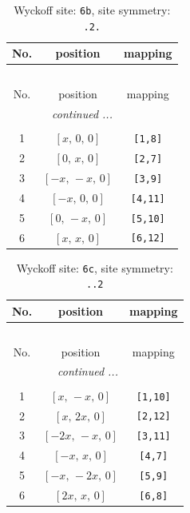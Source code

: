 \documentclass[fleqn,8pt]{jsarticle}
\begin{document}
\begin{longtable}{ccc}
\caption{Wyckoff site: {\tt 6b}, site symmetry: {\tt .2.}}
 \\
 \hline \hline
No. & position & mapping \\ \hline \endfirsthead

\multicolumn{2}{l}{\tablename\ \thetable{}} \\
 \hline \hline
No. & position & mapping \\ \hline \endhead

 \hline \hline
\multicolumn{2}{r}{\footnotesize\it continued ...} \\ \endfoot

 \hline \hline
\multicolumn{2}{r}{} \\ \endlastfoot

1 & $\left[ x,\, 0,\, 0 \right]$ & {\tt [1,8]} \\ \hline
2 & $\left[ 0,\, x,\, 0 \right]$ & {\tt [2,7]} \\ \hline
3 & $\left[ - x,\, - x,\, 0 \right]$ & {\tt [3,9]} \\ \hline
4 & $\left[ - x,\, 0,\, 0 \right]$ & {\tt [4,11]} \\ \hline
5 & $\left[ 0,\, - x,\, 0 \right]$ & {\tt [5,10]} \\ \hline
6 & $\left[ x,\, x,\, 0 \right]$ & {\tt [6,12]} \\
\end{longtable}
\renewcommand{\arraystretch}{1.2}
\begin{longtable}{ccc}
\caption{Wyckoff site: {\tt 6c}, site symmetry: {\tt ..2}}
 \\
 \hline \hline
No. & position & mapping \\ \hline \endfirsthead

\multicolumn{2}{l}{\tablename\ \thetable{}} \\
 \hline \hline
No. & position & mapping \\ \hline \endhead

 \hline \hline
\multicolumn{2}{r}{\footnotesize\it continued ...} \\ \endfoot

 \hline \hline
\multicolumn{2}{r}{} \\ \endlastfoot

1 & $\left[ x,\, - x,\, 0 \right]$ & {\tt [1,10]} \\ \hline
2 & $\left[ x,\, 2 x,\, 0 \right]$ & {\tt [2,12]} \\ \hline
3 & $\left[ - 2 x,\, - x,\, 0 \right]$ & {\tt [3,11]} \\ \hline
4 & $\left[ - x,\, x,\, 0 \right]$ & {\tt [4,7]} \\ \hline
5 & $\left[ - x,\, - 2 x,\, 0 \right]$ & {\tt [5,9]} \\ \hline
6 & $\left[ 2 x,\, x,\, 0 \right]$ & {\tt [6,8]} \\
\end{longtable}
\end{document}
